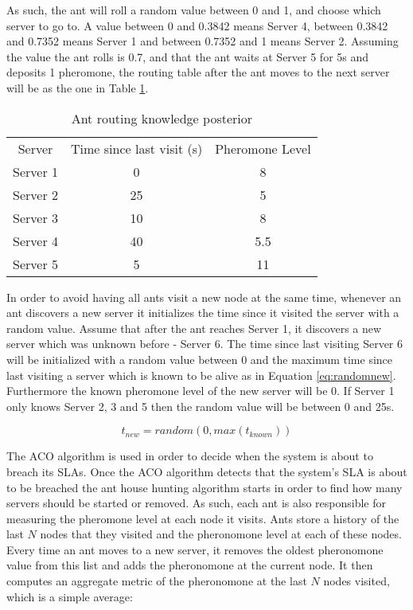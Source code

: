As such, the ant will roll a random value between 0 and 1, and choose which server to go to. A value between 0 and 0.3842 means Server 4, between 0.3842 and 0.7352 means Server 1 and between 0.7352 and 1 means Server 2. Assuming the value the ant rolls is 0.7, and that the ant waits at Server 5 for 5s and deposits 1 pheromone, the routing table after the ant moves to the next server will be as the one in Table \ref{tab:ant_post}.

\begin{table}
\centering
\begin{tabular}{c|c|c}
Server & Time since last visit (s) & Pheromone Level \\
Server 1 & 0 & 8 \\
Server 2 & 25 & 5 \\
Server 3 & 10 & 8 \\
Server 4 & 40 & 5.5 \\
Server 5 & 5 & 11 \\
\end{tabular}
\caption{Ant routing knowledge posterior}
\label{tab:ant_post}
\end{table}

In order to avoid having all ants visit a new node at the same time, whenever an ant discovers a new server it initializes the time since it visited the server with a random value. Assume that after the ant reaches Server 1, it discovers a new server which was unknown before - Server 6. The time since last visiting Server 6 will be initialized with a random value between 0 and the maximum time since last visiting a server which is known to be alive as in Equation \ref{eq:randomnew}. Furthermore the known pheromone level of the new server will be 0. If Server 1 only knows Server 2, 3 and 5 then the random value will be between 0 and 25s.

\begin{equation}
t_{new} = random(0, max(t_{known}))
\label{eq:randomnew}
\end{equation}

The ACO algorithm is used in order to decide when the system is about to breach its SLAs. Once the ACO algorithm detects that the system's SLA is about to be breached the ant house hunting algorithm starts in order to find how many servers should be started or removed. As such, each ant is also responsible for measuring the pheromone level at each node it visits. Ants store a history of the last $N$ nodes that they visited and the pheronomone level at each of these nodes. Every time an ant moves to a new server, it removes the oldest pheronomone value from this list and adds the pheronomone at the current node. It then computes an aggregate metric of the pheronomone at the last $N$ nodes visited, which is a simple average:

